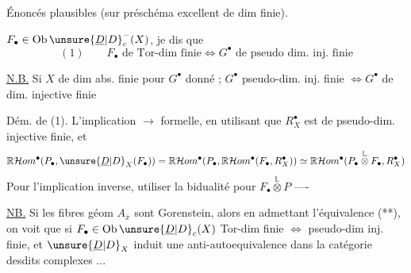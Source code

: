 Énoncés plausibles (sur préschéma excellent de dim finie).

$F_\bullet\in\operatorname{Ob}\unsure{\underline{D}|D}_c^-(X)$,  je dis que
\[
(1)\qquad F_\bullet\text{ de Tor-dim finie}\Longleftrightarrow G^{\bullet}\text{ de pseudo dim. inj. finie}
\]
\margin{(**)}

\uline{N.B.} Si $X$ de dim abs. finie  pour $G^{\bullet}$ donné ; $G^{\bullet}$ pseudo-dim. inj. finie $\Longleftrightarrow G^{\bullet}$ de dim. injective finie

Dém. de (1). L'implication $\longrightarrow$ formelle, en utilisant que $R_X^{\bullet}$ est de pseudo-dim. injective finie, et
\[
\mathbb{R}\mathcal{H}om^{\bullet}(P_\bullet,\unsure{\underline{D}|D}_X(F_\bullet))
=\mathbb{R}\mathcal{H}om^{\bullet}(P_\bullet,\mathbb{R}\mathcal{H}om^{\bullet}(F_\bullet,R_X^{\bullet}))
\simeq\mathbb{R}\mathcal{H}om^{\bullet}(P_\bullet\overset{\mathbb L}{\otimes}F_\bullet,R_X^{\bullet})
\]
Pour l'implication inverse, utiliser la bidualité pour $F_\bullet\overset{\mathbb L}{\otimes}P$ ----

\uline{NB.} Si les fibres géom $A_{\bar{x}}$ sont Gorenstein, alors en admettant l'équivalence (**), on voit que si $F_\bullet\in\operatorname{Ob}\unsure{\underline{D}|D}_c(X)$ Tor-dim finie $\Longleftrightarrow$ pseudo-dim inj. finie, et $\unsure{\underline{D}|D}_X$ induit une anti-autoequivalence dans la catégorie desdits complexes ...
